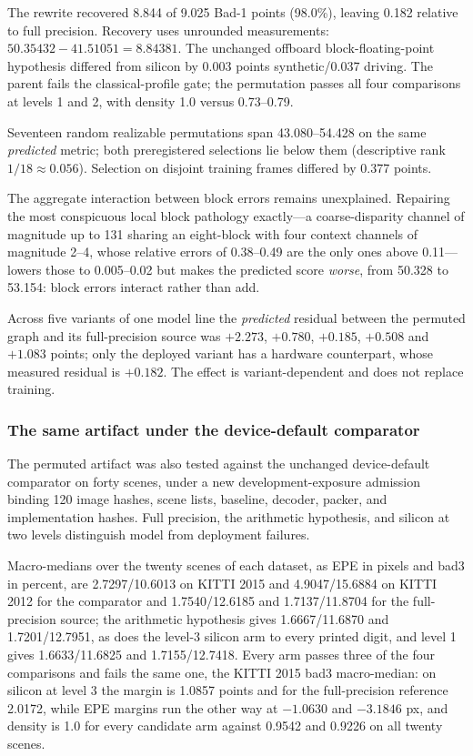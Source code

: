 \documentclass[sigconf,review,anonymous]{acmart}
\begin{document}
The rewrite recovered 8.844 of 9.025 Bad-1 points (98.0\%), leaving 0.182 relative to full precision. Recovery uses unrounded measurements: $50.35432-41.51051=8.84381$. The unchanged offboard block-floating-point hypothesis differed from silicon by 0.003 points synthetic/0.037 driving. The parent fails the classical-profile gate; the permutation passes all four comparisons at levels 1 and 2, with density 1.0 versus 0.73--0.79.

Seventeen random realizable permutations span 43.080--54.428 on the same \emph{predicted} metric; both preregistered selections lie below them (descriptive rank $1/18 \approx 0.056$). Selection on disjoint training frames differed by 0.377 points.

The aggregate interaction between block errors remains unexplained. Repairing the most conspicuous local block pathology exactly---a coarse-disparity channel of magnitude up to 131 sharing an eight-block with four context channels of magnitude 2--4, whose relative errors of 0.38--0.49 are the only ones above 0.11---lowers those to 0.005--0.02 but makes the predicted score \emph{worse}, from 50.328 to 53.154: block errors interact rather than add.

Across five variants of one model line the \emph{predicted} residual between the permuted graph and its full-precision source was $+2.273$, $+0.780$, $+0.185$, $+0.508$ and $+1.083$ points; only the deployed variant has a hardware counterpart, whose measured residual is $+0.182$. The effect is variant-dependent and does not replace training.

\subsubsection{The same artifact under the device-default comparator}
\label{sec:e2}
The permuted artifact was also tested against the unchanged device-default comparator on forty scenes, under a new development-exposure admission binding 120 image hashes, scene lists, baseline, decoder, packer, and implementation hashes. Full precision, the arithmetic hypothesis, and silicon at two levels distinguish model from deployment failures.

Macro-medians over the twenty scenes of each dataset, as EPE in pixels and bad3 in percent, are 2.7297/10.6013 on KITTI 2015 and 4.9047/15.6884 on KITTI 2012 for the comparator and 1.7540/12.6185 and 1.7137/11.8704 for the full-precision source; the arithmetic hypothesis gives 1.6667/11.6870 and 1.7201/12.7951, as does the level-3 silicon arm to every printed digit, and level 1 gives 1.6633/11.6825 and 1.7155/12.7418. Every arm passes three of the four comparisons and fails the same one, the KITTI 2015 bad3 macro-median: on silicon at level 3 the margin is 1.0857 points and for the full-precision reference 2.0172, while EPE margins run the other way at $-1.0630$ and $-3.1846$ px, and density is 1.0 for every candidate arm against 0.9542 and 0.9226 on all twenty scenes.
\end{document}
